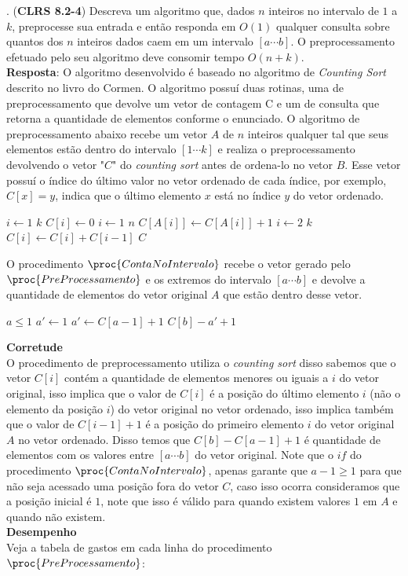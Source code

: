 
. (\textbf{CLRS 8.2-4}) Descreva um algoritmo que, dados $n$ inteiros 
no intervalo de $1$ a $k$, preprocesse sua entrada e então responda em $O(1)$ 
qualquer consulta sobre quantos dos $n$ inteiros dados caem em um intervalo $[a 
\cdots b]$. O preprocessamento efetuado pelo seu algoritmo deve consomir tempo 
$O(n + k)$.
\\[6pt]
\textbf{Resposta}: O algoritmo desenvolvido é baseado no algoritmo de 
\textit{Counting Sort} descrito no livro do Cormen. O algoritmo possuí duas 
rotinas, uma de preprocessamento que devolve um vetor de contagem C e um de 
consulta que retorna a quantidade de elementos conforme o enunciado. O algoritmo 
de preprocessamento abaixo recebe um vetor $A$ de $n$ inteiros qualquer tal que 
seus elementos estão dentro do intervalo $[1 \cdots k]$ e  realiza o 
preprocessamento devolvendo o vetor "$C$" do \textit{counting sort} antes de 
ordena-lo no vetor $B$. Esse vetor possuí o índice do último valor no vetor 
ordenado de cada índice, por exemplo, $C[x] = y$, indica que o último elemento 
$x$ está no índice $y$ do vetor ordenado.

\begin{codebox}
\li    \For $i \gets 1$ \To $k$
\li    \Do
            $C[i] \gets 0$
       \End
\li    \For $i \gets 1$ \To $n$
\li    \Do
            $C[A[i]] \gets C[A[i]] + 1$
       \End
\li    \For $i \gets 2$ \To $k$
\li    \Do
            $C[i] \gets C[i] + C[i-1]$
       \End
\li    \Return $C$
\End
\end{codebox}
O procedimento $\proc{ContaNoIntervalo}$ recebe o vetor gerado pelo 
$\proc{PreProcessamento}$ e os extremos do intervalo $[a \cdots b]$ e devolve a 
quantidade de elementos do vetor original $A$ que estão dentro desse vetor.
\begin{codebox}
    \li \If $a \leq 1$
    \li     \Then
            $a' \gets 1$
    \li \Else
            $a' \gets C[a-1] + 1$
        \End
    \li \Return $C[b] - a' + 1$
\End
\end{codebox}
\textbf{Corretude}
\\[6pt]
O procedimento de preprocessamento utiliza o \textit{counting sort} disso 
sabemos que o vetor $C[i]$ contém a quantidade de elementos menores ou iguais a 
$i$ do vetor original, isso implica que o valor de $C[i]$ é a posição do último 
elemento $i$ (não o elemento da posição $i$) do vetor original no vetor 
ordenado, isso implica também que o valor de $C[i-1] + 1$ é a posição do 
primeiro elemento $i$ do vetor original $A$ no vetor ordenado. Disso temos que 
$C[b] - C[a-1] + 1$ é quantidade de elementos com os valores entre $[a \cdots 
b]$ do vetor original. Note que o $if$ do procedimento 
$\proc{ContaNoIntervalo}$, apenas garante que $a-1 \geq 1$ para que não seja 
acessado uma posição fora do vetor $C$, caso isso ocorra consideramos que a 
posição inicial é $1$, note que isso é válido para quando existem valores $1$ em 
$A$ e quando não existem.
\\[6pt]
\textbf{Desempenho}
\\[6pt]
Veja a tabela de gastos em cada linha do procedimento $\proc{PreProcessamento}$:

